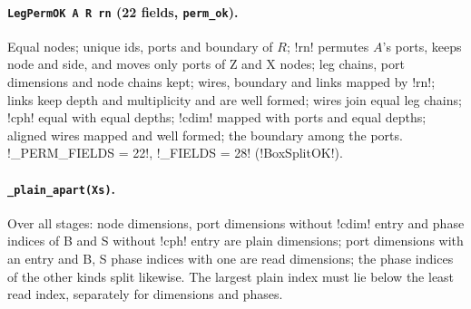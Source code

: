 {{{\paragraph{\texttt{LegPermOK A R rn} (22 fields, \texttt{perm\_ok}).} Equal nodes; unique ids, ports
and boundary of $R$; \lexcode!rn! permutes $A$'s ports, keeps node and side, and moves only ports of
Z and X nodes; leg chains, port dimensions and node chains kept; wires, boundary and links mapped
by \lexcode!rn!; links keep depth and multiplicity and are well formed; wires join equal leg chains;
\lexcode!cph! equal with equal depths; \lexcode!cdim! mapped with ports and equal depths; aligned wires
mapped and well formed; the boundary among the ports. \lexpy!_PERM_FIELDS = 22!,
\lexpy!_FIELDS = 28! (\lexlean!BoxSplitOK!).

\paragraph{\texttt{\_plain\_apart(Xs)}.} Over all stages: node dimensions, port dimensions without
\lexcode!cdim! entry and phase indices of B and S without \lexcode!cph! entry are plain dimensions; port
dimensions with an entry and B, S phase indices with one are read dimensions; the phase indices
of the other kinds split likewise. The largest plain index must lie below the least read index,
separately for dimensions and phases.

}}}
